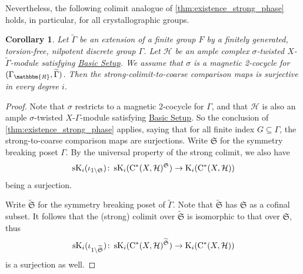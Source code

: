 \documentclass{amsart}
\numberwithin{figure}{section}
\numberwithin{equation}{section}
\numberwithin{table}{section}
\theoremstyle{plain}
\newtheorem{corollary}[equation]{Corollary}
\theoremstyle{definition}
\theoremstyle{remark}
\theoremstyle{nonumber}
\newcommand{\refbasicsetup}{\hyperref[basic_setup]{Basic Setup}}
\newcommand{\R}{\mathbb{R}}
\newcommand{\K}{\relax\ifmmode\operatorname{K}\else\textup{K}\fi}
\newcommand{\sK}{\operatorname{sK}}
\newcommand{\Cst}{\relax\ifmmode\mathrm{C}^*\else\textup{C*}\fi}
\renewcommand{\mathbb}{\mathbbm} %
\begin{document}
\medskip
Nevertheless, the following colimit analogue of
\cref{thm:existence_strong_phase} holds, in particular, for all
crystallographic groups.

\begin{corollary}
\label{cor:existence.strong.colimit}
Let \( \widetilde{\Gamma} \) be an extension of a finite group $F$ by a
finitely generated, torsion-free, nilpotent discrete group $\Gamma$.  Let
\( \mathcal{H} \) be an ample complex $\sigma$-twisted \( X \)-\(
\widetilde{\Gamma} \)-module satisfying \refbasicsetup.  We assume that
$\sigma$ is a magnetic 2-cocycle for $(\Gamma_\R,\widetilde{\Gamma})$.
Then the strong-colimit-to-coarse comparison maps is surjective in
every degree \( i \).
\end{corollary}
\begin{proof}
Note that $\sigma$ restricts to a magnetic 2-cocycle for $\Gamma$, and that
$\mathcal{H}$ is also an ample $\sigma$-twisted \( X \)-\( \Gamma \)-module
satisfying \refbasicsetup. So the conclusion of
\cref{thm:existence_strong_phase} applies, saying that for all finite index
$G\subseteq \Gamma$, the strong-to-coarse comparison maps are surjections.
Write $\mathfrak{S}$ for the symmetry breaking poset $\Gamma$. By the
universal property of the strong colimit, we also have
\[
\sK_i(\iota_{1\backslash\mathfrak{S}})\colon \sK_i(\Cst(X,\mathcal{H})^\mathfrak{S})\to \K_i(\Cst(X,\mathcal{H}))
\]
being a surjection.

Write $\widetilde{\mathfrak{S}}$ for the symmetry breaking poset of $\widetilde{\Gamma}$. Note that $\widetilde{\mathfrak{S}}$ has $\mathfrak{S}$ as a cofinal subset. It follows that the (strong) colimit over $\widetilde{\mathfrak{S}}$ is isomorphic to that over $\mathfrak{S}$, thus
\[
\sK_i(\iota_{1\backslash\widetilde{\mathfrak{S}}})\colon \sK_i(\Cst(X,\mathcal{H})^{\widetilde{\mathfrak{S}}})\to \K_i(\Cst(X,\mathcal{H}))
\]
is a surjection as well.
\end{proof}
\end{document}
